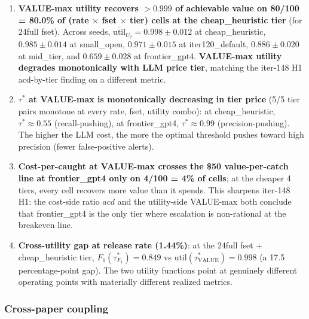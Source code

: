 \begin{enumerate}
\item \textbf{VALUE-max utility recovers $>0.999$ of achievable
value on 80/100 = 80.0\% of (rate $\times$ fset $\times$ tier) cells at
the cheap\_heuristic tier} (for 24full fset). Across seeds,
$\overline{\mathrm{util}}_{U_2} = 0.998 \pm 0.012$ at cheap\_heuristic,
$0.985 \pm 0.014$ at small\_open, $0.971 \pm 0.015$ at iter120\_default,
$0.886 \pm 0.020$ at mid\_tier, and $0.659 \pm 0.028$ at frontier\_gpt4.
\textbf{VALUE-max utility degrades monotonically with LLM price tier},
matching the iter-148 H1 acd-by-tier finding on a different metric.

\item \textbf{$\tau^*$ at VALUE-max is monotonically decreasing in tier
price} (5/5 tier pairs monotone at every rate, fset, utility combo):
at cheap\_heuristic, $\tau^* \approx 0.55$ (recall-pushing), at
frontier\_gpt4, $\tau^* \approx 0.99$ (precision-pushing). The
higher the LLM cost, the more the optimal threshold pushes toward
high precision (fewer false-positive alerts).

\item \textbf{Cost-per-caught at VALUE-max crosses the \$50
value-per-catch line at frontier\_gpt4 only on 4/100 = 4\% of cells};
at the cheaper 4 tiers, every cell recovers more value than it spends.
This sharpens iter-148 H1: the cost-side ratio $acd$ and the
utility-side VALUE-max both conclude that frontier\_gpt4 is the only tier
where escalation is non-rational at the breakeven line.

\item \textbf{Cross-utility gap at release rate (1.44\%)}: at the
24full fset + cheap\_heuristic tier, $F_1(\tau^*_{F_1}) = 0.849$ vs
$\mathrm{util}(\tau^*_{\mathrm{VALUE}}) = 0.998$ (a 17.5 percentage-point
gap). The two utility functions point at genuinely different
operating points with materially different realized metrics.
\end{enumerate}

\subsubsection{Cross-paper coupling}

